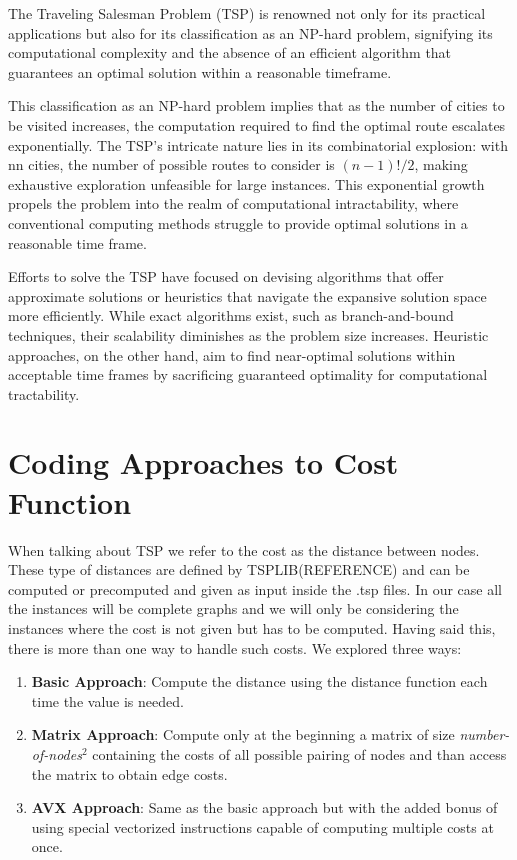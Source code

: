 \documentclass[a4paper]{article}
\begin{document}
The Traveling Salesman Problem (TSP) is renowned not only for its practical applications but also for its classification as an NP-hard problem, signifying its computational complexity and the absence of an efficient algorithm that guarantees an optimal solution within a reasonable timeframe.

This classification as an NP-hard problem implies that as the number of cities to be visited increases, the computation required to find the optimal route escalates exponentially. The TSP's intricate nature lies in its combinatorial explosion: with nn cities, the number of possible routes to consider is $(n-1)!/2$, making exhaustive exploration unfeasible for large instances. This exponential growth propels the problem into the realm of computational intractability, where conventional computing methods struggle to provide optimal solutions in a reasonable time frame.

Efforts to solve the TSP have focused on devising algorithms that offer approximate solutions or heuristics that navigate the expansive solution space more efficiently. While exact algorithms exist, such as branch-and-bound techniques, their scalability diminishes as the problem size increases. Heuristic approaches, on the other hand, aim to find near-optimal solutions within acceptable time frames by sacrificing guaranteed optimality for computational tractability.


\section{Coding Approaches to Cost Function}

When talking about TSP we refer to the cost as the distance between nodes. These type of distances are defined by TSPLIB(REFERENCE) and can be computed or precomputed and given as input inside the .tsp files. In our case all the instances will be complete graphs and we will only be considering the instances where the cost is not given but has to be computed. Having said this, there is more than one way to handle such costs. We explored three ways:

\begin{enumerate}
	\item \textbf{Basic Approach}: Compute the distance using the distance function each time the value is needed.
	\item \textbf{Matrix Approach}: Compute only at the beginning a matrix of size \textit{number-of-nodes}$^2$ containing the costs of all possible pairing of nodes and than access the matrix to obtain edge costs.
	\item \textbf{AVX Approach}: Same as the basic approach but with the added bonus of using special vectorized instructions capable of computing multiple costs at once.
\end{enumerate}
\end{document}
